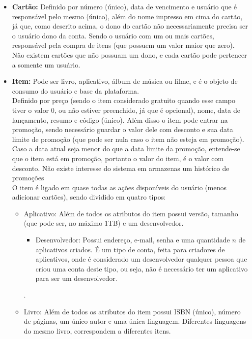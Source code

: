 \documentclass[a4paper, 11pt]{article}
\begin{document}
\begin{itemize}
\begin{itemize}
    \end{itemize}.
    \item \textbf{Cartão:} Definido por número (único), data de vencimento e usuário que é responsável pelo mesmo (único), além do nome impresso em cima do cartão, já que, como descrito acima, o dono do cartão não necessariamente precisa ser o usuário dono da conta. Sendo o usuário com um ou mais cartões, responsável pela compra de itens (que possuem um valor maior que zero). Não existem cartões que não possuam um dono, e cada cartão pode pertencer a somente um usuário.
    \item \textbf{Item:} Pode ser livro, aplicativo, álbum de música ou filme, e é o objeto de consumo do usuário e base da plataforma.\\
    Definido por preço (sendo o item considerado gratuito quando esse campo tiver o valor 0, ou não estiver preenchido, já que é opcional), nome, data de lançamento, resumo e código (único). Além disso o item pode entrar na promoção, sendo necessário guardar o valor dele com desconto e sua data limite de promoção (que pode ser nula caso o item não esteja em promoção). Caso a data atual seja menor do que a data limite da promoção, entende-se que o item está em promoção, portanto o valor do item, é o valor com desconto. Não existe interesse do sistema em armazenas um histórico de promoções\\
    O item é ligado em quase todas as ações disponíveis do usuário (menos adicionar cartões), sendo dividido em quatro tipos:
    \begin{itemize}
        \item Aplicativo: Além de todos os atributos do item possui versão, tamanho (que pode ser, no máximo 1TB) e um desenvolvedor. 
         \begin{itemize}
            \item Desenvolvedor: Possui endereço, e-mail, senha e uma quantidade $n$ de aplicativos criados. É um tipo de conta, feita para criadores de aplicativos, onde é considerado um desenvolvedor qualquer pessoa que criou uma conta deste tipo, ou seja, não é necessário ter um aplicativo para ser um desenvolvedor.
         \end{itemize}.
        \item Livro: Além de todos os atributos do item possui ISBN\cite{ISBN} (único), número de páginas, um único autor e uma única linguagem. Diferentes linguagens do mesmo livro, correspondem a diferentes itens.
        \begin{itemize}

\end{itemize}
\end{itemize}
\end{itemize}
\end{document}
